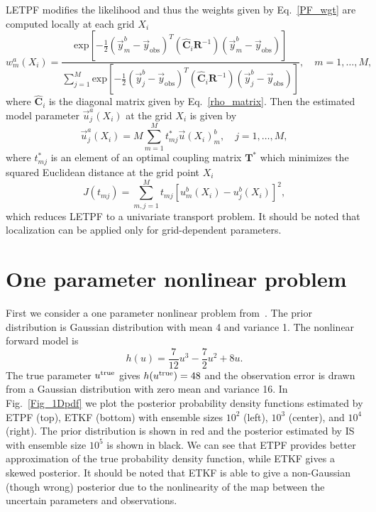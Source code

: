 \documentclass[12, a4paper]{article}
\numberwithin{equation}{section}
\begin{document}
LETPF modifies the likelihood and thus the weights given by Eq.~\eqref{PF_wgt} are computed locally at each grid $X_i$
\begin{equation}\label{PF_wgtR0}
w^a_m({X}_i) = \frac{\text{exp}\left[-\frac{1}{2}(\vec{y}_m^b - \vec{y}_{\text{obs}})^T ( \hat{\textbf{C}}_i\textbf{R}^{-1}) (\vec{y}_m^b - \vec{y}_{\text{obs}})\right]}{\sum_{j=1}^{M}\text{exp}\left[-\frac{1}{2}(\vec{y}_j^b - \vec{y}_{\text{obs}})^T ( \hat{\textbf{C}}_i\textbf{R}^{-1}) (\vec{y}_j^b - \vec{y}_{\text{obs}})\right]}, \quad m=1,\hdots,M, 
\end{equation}
where $\hat{\textbf{C}}_i$ is the diagonal matrix given by Eq.~\eqref{rho_matrix}. Then the estimated model parameter $ \vec{u}_j^a(X_i)$ at the grid $X_i$ is given by
\begin{equation*}
\vec{u}_j^a(X_i) = M\sum_{m=1}^{M} t_{mj}^*\vec{u}(X_i)_m^b ,   \quad j = 1,\hdots,M,
\end{equation*}
where $t_{mj}^*$ is an element of an optimal coupling matrix $\textbf{T}^{*}$  which minimizes the squared Euclidean distance at the grid point $X_i$
\begin{equation}\label{TR0}
J(t_{mj}) = \sum_{m,j=1}^{M} t_{mj}  [u_{m}^b(X_i)-u_{j}^b(X_i)]^2,
\end{equation}
which reduces LETPF to a univariate transport problem.
It should be noted that localization can be applied only for grid-dependent parameters.
 
  \section{One parameter nonlinear problem} \label{Sec:1D}
First we consider a one parameter nonlinear problem from~\cite{ChOl13}. 
The prior distribution is Gaussian distribution with mean 4 and variance 1.  The nonlinear forward model is  
\[
h(u) = \frac{7}{12} u^3 -\frac{7}{2}u^2 + 8u.
\]
The true parameter $u^{\rm true}$ gives $h(u^{\rm true}) = 48$ and the observation error is drawn from a Gaussian distribution with zero mean and variance 16. In Fig.~\ref{Fig_1Dpdf} we plot the posterior probability density functions estimated by ETPF (top), ETKF (bottom) with ensemble sizes $10^2$ (left), $10^3$ (center), and $10^4$ (right). The prior distribution is shown in red and the posterior estimated by IS with ensemble size $10^5$ is shown in black. We can see that ETPF provides better approximation of the true probability density function, while ETKF gives a skewed posterior. It should be noted that ETKF is able to give a non-Gaussian (though wrong) posterior due to the nonlinearity of the map between the uncertain parameters and observations. 
\end{document}

